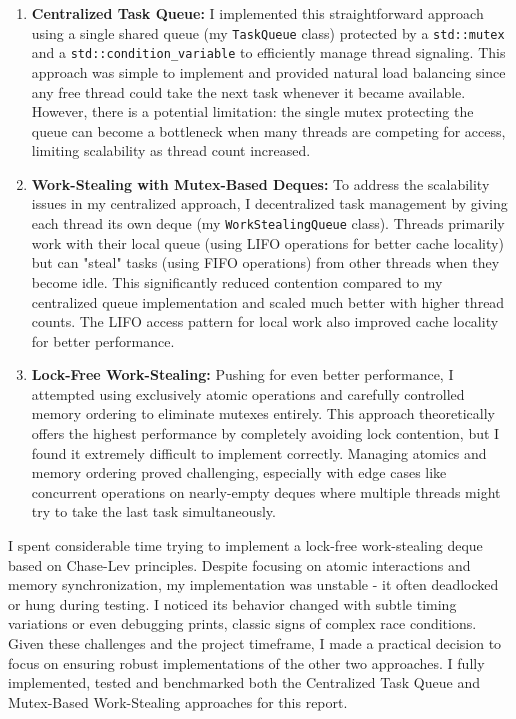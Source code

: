\documentclass[10pt]{article}
\newcommand{\code}[1]{\texttt{#1}}
\begin{document}
\begin{enumerate}
    \item \textbf{Centralized Task Queue:} I implemented this straightforward approach using a single shared queue (my \code{TaskQueue} class) protected by a \code{std::mutex} and a \code{std::condition\_variable} to efficiently manage thread signaling. This approach was simple to implement and provided natural load balancing since any free thread could take the next task whenever it became available. However, there is a potential limitation: the single mutex protecting the queue can become a bottleneck when many threads are competing for access, limiting scalability as thread count increased.

    \item \textbf{Work-Stealing with Mutex-Based Deques:} To address the scalability issues in my centralized approach, I decentralized task management by giving each thread its own deque (my \code{WorkStealingQueue} class). Threads primarily work with their local queue (using LIFO operations for better cache locality) but can "steal" tasks (using FIFO operations) from other threads when they become idle. This significantly reduced contention compared to my centralized queue implementation and scaled much better with higher thread counts. The LIFO access pattern for local work also improved cache locality for better performance.

    \item \textbf{Lock-Free Work-Stealing:} Pushing for even better performance, I attempted using exclusively atomic operations and carefully controlled memory ordering to eliminate mutexes entirely. This approach theoretically offers the highest performance by completely avoiding lock contention, but I found it extremely difficult to implement correctly. Managing atomics and memory ordering proved challenging, especially with edge cases like concurrent operations on nearly-empty deques where multiple threads might try to take the last task simultaneously.
\end{enumerate}

I spent considerable time trying to implement a lock-free work-stealing deque based on Chase-Lev principles. Despite focusing on atomic interactions and memory synchronization, my implementation was unstable - it often deadlocked or hung during testing. I noticed its behavior changed with subtle timing variations or even debugging prints, classic signs of complex race conditions. Given these challenges and the project timeframe, I made a practical decision to focus on ensuring robust implementations of the other two approaches. I fully implemented, tested and benchmarked both the Centralized Task Queue and Mutex-Based Work-Stealing approaches for this report.
\end{document}
